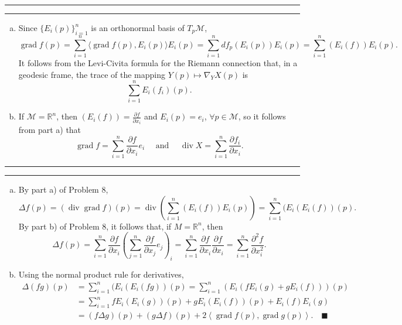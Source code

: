 \documentclass[11pt]{article}
\newcounter{questionCounter}
\newcounter{partCounter}[questionCounter]
\newenvironment{question}[2][\arabic{questionCounter}]{%
    \setcounter{partCounter}{0}%
    \vspace{.25in} \hrule \vspace{0.5em}%
        \noindent{\bf #2}%
    \vspace{0.8em} \hrule \vspace{.10in}%
    \addtocounter{questionCounter}{1}%
}{}
\renewcommand{\qed}{\quad \ensuremath{\blacksquare}}    %
\renewcommand{\div}{\operatorname{div}} %
\newcommand{\grad}{\operatorname{grad}} %
\newcommand{\R}{\mathbb{R}}             %
\newcommand{\M}{\mathcal{M}}            %
\begin{document}
\begin{question}{Exercise 8}
\begin{enumerate}[a)]
\item Since $\{E_i(p)\}_{i = 1}^n$ is an orthonormal basis of $T_p\M$,
\[\grad f(p)
    = \sum_{i = 1}^n \langle \grad f(p), E_i(p) \rangle E_i(p)
    = \sum_{i = 1}^n d f_p(E_i(p)) E_i(p)
    = \sum_{i = 1}^n (E_i(f)) E_i(p).
\]
It follows from the Levi-Civita formula for the Riemann connection that, in a
geodesic frame, the trace of the mapping $Y(p) \mapsto \nabla_Y X(p)$ is
\[\sum_{i = 1}^n E_i(f_i)(p).\]

\item If $\M = \R^n$, then $(E_i(f)) = \frac{\partial f}{\partial x_i}$ and
$E_i(p) = e_i$, $\forall p \in \M$, so it follows from part a) that
\[\grad f = \sum_{i = 1}^n \frac{\partial f}{\partial x_i} e_i
    \quad \mbox{ and } \quad
\div X = \sum_{i = 1}^n \frac{\partial f_i}{\partial x_i}.\]

\end{enumerate}
\end{question}

\begin{question}{Exercise 9}
\begin{enumerate}[a)]
\item By part a) of Problem 8,
\[\Delta f(p)
    = (\div \grad f)(p)
    = \div \left( \sum_{i = 1}^n (E_i(f))E_i(p) \right)
    = \sum_{i = 1}^n (E_i(E_i(f)) (p)
.\]
By part b) of Problem 8, it follows that, if $M = \R^n$, then
\[\Delta f(p)
    = \sum_{i = 1}^n \frac{\partial f}{\partial x_i}
        \left( \sum_{j = 1}^n \frac{\partial f}{\partial x_j} e_j \right)_i
    = \sum_{i = 1}^n \frac{\partial f}{\partial x_i}
                                            \frac{\partial f}{\partial x_i}
    = \sum_{i = 1}^n \frac{\partial^2 f}{\partial x_i^2}.
\]

\item Using the normal product rule for derivatives,
\begin{align*}
\Delta(fg) (p)
 &  = \sum_{i = 1}^n (E_i(E_i(fg)) (p)
    = \sum_{i = 1}^n (E_i (fE_i(g) + gE_i(f))) (p)  \\
 &  = \sum_{i = 1}^n fE_i(E_i(g))(p) + gE_i(E_i(f))(p) + E_i(f)E_i(g)  \\
 &  = (f\Delta g)(p) + (g\Delta f)(p)
                        + 2\left\langle \grad f(p), \grad g(p) \right\rangle.
    \qed
\end{align*}
\end{enumerate}
\end{question}
\end{document}
